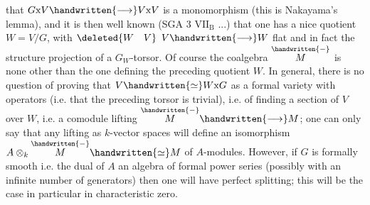 that $G\mathrm{x}V\handwritten{\longrightarrow}V\mathrm{x}V$ is a monomorphism (this is Nakayama's lemma), and it is then well known (SGA 3 $\mathrm{VII}_{\mathrm{B}}$ ...) that  one has a nice quotient $W=V/G$, with $\deleted{W\quad V}$ $V\handwritten{\longrightarrow}W$ flat and in fact the structure projection of a $G_{W}$-torsor. Of course the coalgebra $\overset{\handwritten{-}}{M}$ is none other than the one defining the preceding quotient $W$. In general, there is no question of proving that $V\handwritten{\simeq}W\mathrm{x}G$ as a formal variety with operators (i.e. that the preceding torsor is trivial), i.e. of finding a section of $V$ over $W$, i.e. a comodule lifting $\overset{\handwritten{-}}{M}\handwritten{\longrightarrow}M$; one can only say that any lifting as $k$-vector spaces will define an isomorphism $A\otimes_{k}\overset{\handwritten{-}}{M}\handwritten{\simeq}M$ of $A$-modules. However, if $G$ is formally smooth i.e. the dual of $A$ an algebra of formal power series (possibly with an infinite number of generators) then one will have perfect splitting; this will be the case in particular in characteristic zero.

